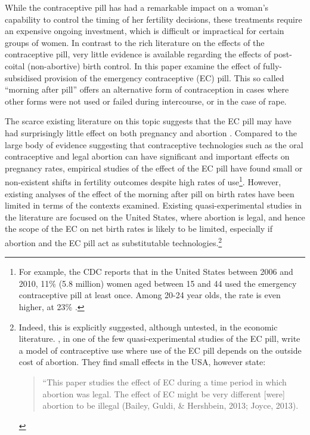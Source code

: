 While the contraceptive pill has had a remarkable impact on a woman's capability
to control the timing of her fertility decisions, these treatments require an
expensive ongoing investment, which is difficult or impractical for certain 
groups of women.  In contrast to the rich literature on the effects of the 
contraceptive pill, very little evidence is available regarding the effects of 
post-coital (non-abortive) birth control.  In this paper \person examine the 
effect of fully-subsidised provision of the emergency contraceptive (EC) pill.  
This so called ``morning after pill'' offers an alternative form of 
contraception in cases where other forms were not used or failed during 
intercourse, or in the case of rape.

The scarce existing literature on this topic suggests that the EC pill may have 
had surprisingly little effect on both pregnancy and abortion 
\citep{Grossetal2014,Durrance2013}. Compared to the large body of evidence 
suggesting that contraceptive technologies such as the oral contraceptive and 
legal abortion can have significant and important effects on pregnancy rates, 
empirical studies of the effect of the EC pill have found small or non-existent 
shifts in fertility outcomes despite high rates of use\footnote{For example, 
the CDC reports that in the United States between 2006 and 2010, 11\% (5.8 
million) women aged between 15 and 44 used the emergency contraceptive pill at 
least once.  Among 20-24 year olds, the rate is even higher, at 23\% 
\citep{Danielsetal2013}.}.  However, existing analyses of the effect of the 
morning after pill on birth rates have been limited in terms of the contexts 
examined.  Existing quasi-experimental studies in the literature are focused on 
the United States, where abortion is legal, and hence the scope of the EC on 
net birth rates is likely to be limited, especially if abortion and the EC pill
act as substitutable technologies.\footnote{Indeed, this is explicitly 
suggested, although untested, in the economic literature. \citet{Grossetal2014}, 
in one of the few quasi-experimental studies of the EC pill, write a model of 
contraceptive use where use of the EC pill depends on the outside cost of 
abortion. They find small effects in the USA, however state:
     \begin{quote}
     ``This paper studies the effect of EC during a time period in which
     abortion was legal. The effect of EC might be very different [were]
     abortion to be illegal (Bailey, Guldi, \& Hershbein, 2013; Joyce,
     2013).
     \end{quote}}


